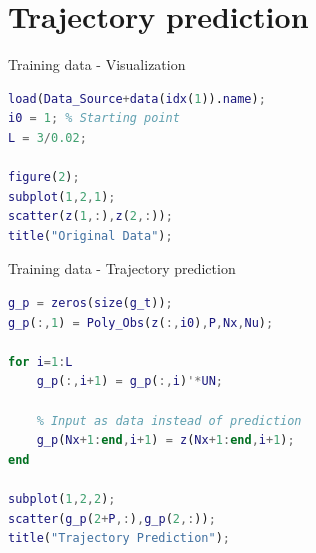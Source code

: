 \documentclass{beamer}
\begin{document}
\section{Trajectory prediction}

\begin{frame}[fragile]{Training data - Visualization}
    \begin{lstlisting}[language=Matlab]
load(Data_Source+data(idx(1)).name);
i0 = 1; % Starting point
L = 3/0.02;

figure(2);
subplot(1,2,1);
scatter(z(1,:),z(2,:));
title("Original Data");
    \end{lstlisting}
\end{frame}

\begin{frame}[fragile]{Training data - Trajectory prediction}
    \begin{lstlisting}[language=Matlab]
g_p = zeros(size(g_t));
g_p(:,1) = Poly_Obs(z(:,i0),P,Nx,Nu);

for i=1:L
    g_p(:,i+1) = g_p(:,i)'*UN;

    % Input as data instead of prediction
    g_p(Nx+1:end,i+1) = z(Nx+1:end,i+1);
end

subplot(1,2,2);
scatter(g_p(2+P,:),g_p(2,:));
title("Trajectory Prediction");
    \end{lstlisting}
\end{frame}
\end{document}
